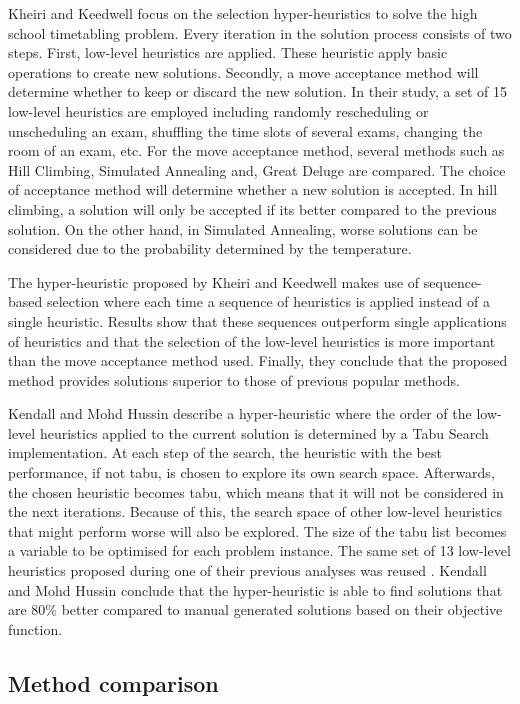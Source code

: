 Kheiri and Keedwell \cite{kheiri2017} focus on the selection hyper-heuristics to solve the high school timetabling problem. Every iteration in the solution process consists of two steps. First, low-level heuristics are applied. These heuristic apply basic operations to create new solutions. Secondly, a move acceptance method will determine whether to keep or discard the new solution. In their study, a set of 15 low-level heuristics are employed including randomly rescheduling or unscheduling an exam, shuffling the time slots of several exams, changing the room of an exam, etc. For the move acceptance method, several methods such as Hill Climbing, Simulated Annealing and, Great Deluge are compared. The choice of acceptance method will determine whether a new solution is accepted. In hill climbing, a solution will only be accepted if its better compared to the previous solution. On the other hand, in Simulated Annealing, worse solutions can be considered due to the probability determined by the temperature.

The hyper-heuristic proposed by Kheiri and Keedwell makes use of sequence-based selection where each time a sequence of heuristics is applied instead of a single heuristic. Results show that these sequences outperform single applications of heuristics and that the selection of the low-level heuristics is more important than the move acceptance method used. Finally, they conclude that the proposed method provides solutions superior to those of previous popular methods.

Kendall and Mohd Hussin \cite{kendall2004} describe a hyper-heuristic where the order of the low-level heuristics applied to the current solution is determined by a Tabu Search implementation. At each step of the search, the heuristic with the best performance, if not tabu, is chosen to explore its own search space. Afterwards, the chosen heuristic becomes tabu, which means that it will not be considered in the next iterations. Because of this, the search space of other low-level heuristics that might perform worse will also be explored. The size of the tabu list becomes a variable to be optimised for each problem instance. The same set of 13 low-level heuristics proposed during one of their previous analyses was reused \cite{kendall2005}. Kendall and Mohd Hussin conclude that the hyper-heuristic is able to find solutions that are 80\% better compared to manual generated solutions based on their objective function.

\subsection{Method comparison}

